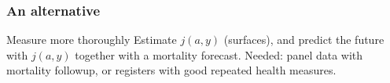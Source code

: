 \documentclass[20pt]{beamer}
\begin{document}
\begin{frame}
\frametitle{An alternative}
\begin{block}{Measure more thoroughly}
Estimate $j(a,y)$ (surfaces), and predict the future with $j(a,y)$ together with
a mortality forecast. Needed: panel data with mortality followup, or registers
with good repeated health measures.
\end{block}

\end{frame}
\end{document}
